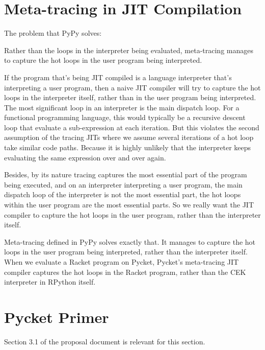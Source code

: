     \section{Meta-tracing in JIT Compilation}
        \begin{mainpoint}
            The problem that PyPy solves:

            Rather than the loops in the interpreter being evaluated, meta-tracing manages to capture the hot loops in the user program being interpreted.
        \end{mainpoint}

        \begin{paragraph-here}
            If the program that's being JIT compiled is a language interpreter that's interpreting a user program, then a naive JIT compiler will try to capture the hot loops in the interpreter itself, rather than in the user program being interpreted. The most significant loop in an interpreter is the main dispatch loop. For a functional programming language, this would typically be a recursive descent loop that evaluate a sub-expression at each iteration. But this violates the second assumption of the tracing JITs where we assume several iterations of a hot loop take similar code paths. Because it is highly unlikely that the interpreter keeps evaluating the same expression over and over again.
        \end{paragraph-here}

        \begin{paragraph-here}
            Besides, by its nature tracing captures the most essential part of the program being executed, and on an interpreter interpreting a user program, the main dispatch loop of the interpreter is not the most essential part, the hot loops within the user program are the most essential parts. So we really want the JIT compiler to capture the hot loops in the user program, rather than the interpreter itself.
        \end{paragraph-here}

        \begin{paragraph-here}
            Meta-tracing defined in PyPy \cite{pypy-main} solves exactly that. It manages to capture the hot loops in the user program being interpreted, rather than the interpreter itself. When we evaluate a Racket program on Pycket, Pycket's meta-tracing JIT compiler captures the hot loops in the Racket program, rather than the CEK interpreter in RPython itself.
        \end{paragraph-here}

    \section{Pycket Primer}

        \begin{todo}[Import]
                Section 3.1 of the proposal document is relevant for this section.
        \end{todo}